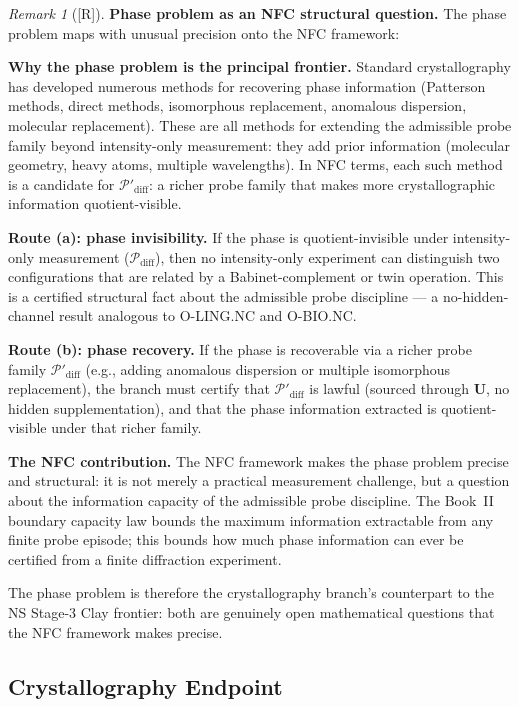 \documentclass[12pt,oneside]{amsbook}
\theoremstyle{plain}
\theoremstyle{definition}
\theoremstyle{remark}
\newtheorem{remark}[theorem]{Remark}
\newcommand{\status}[1]{\textup{[#1]}}
\begin{document}
\begin{remark}[\status{R}]\label{rem:cryst-phase-analysis}
\textbf{Phase problem as an NFC structural question.}
The phase problem maps with unusual precision onto the NFC framework:

\medskip
\textbf{Why the phase problem is the principal frontier.}
Standard crystallography has developed numerous methods for
recovering phase information (Patterson methods, direct methods,
isomorphous replacement, anomalous dispersion, molecular replacement).
These are all methods for extending the admissible probe family
beyond intensity-only measurement: they add prior information
(molecular geometry, heavy atoms, multiple wavelengths).  In NFC
terms, each such method is a candidate for $\mathcal{P}'_{\mathrm{diff}}$:
a richer probe family that makes more crystallographic information
quotient-visible.

\textbf{Route (a): phase invisibility.}  If the phase is
quotient-invisible under intensity-only measurement
($\mathcal{P}_{\mathrm{diff}}$), then no intensity-only experiment
can distinguish two configurations that are related by a
Babinet-complement or twin operation.  This is a certified
structural fact about the admissible probe discipline --- a
no-hidden-channel result analogous to O-LING.NC and O-BIO.NC.

\textbf{Route (b): phase recovery.}  If the phase is recoverable
via a richer probe family $\mathcal{P}'_{\mathrm{diff}}$
(e.g., adding anomalous dispersion or multiple isomorphous
replacement), the branch must certify that
$\mathcal{P}'_{\mathrm{diff}}$ is lawful (sourced through
$\mathbf{U}$, no hidden supplementation), and that the phase
information extracted is quotient-visible under that richer family.

\textbf{The NFC contribution.}  The NFC framework makes the phase
problem precise and structural: it is not merely a practical
measurement challenge, but a question about the information capacity
of the admissible probe discipline.  The Book~II boundary capacity
law bounds the maximum information extractable from any finite
probe episode; this bounds how much phase information can ever
be certified from a finite diffraction experiment.

The phase problem is therefore the crystallography branch's
counterpart to the NS Stage-3 Clay frontier: both are genuinely
open mathematical questions that the NFC framework makes precise.
\end{remark}

\subsection{Crystallography Endpoint}
\end{document}
